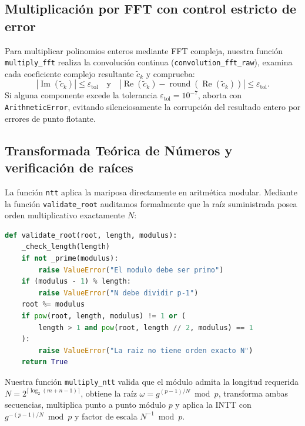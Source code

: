 \subsection{Multiplicación por FFT con control estricto de error}
Para multiplicar polinomios enteros mediante FFT compleja, nuestra función \texttt{multiply\_fft} realiza la convolución continua (\texttt{convolution\_fft\_raw}), examina cada coeficiente complejo resultante $\tilde{c}_k$ y comprueba:
\begin{equation}
|\operatorname{Im}(\tilde{c}_k)| \le \varepsilon_{\text{tol}} \quad \text{y} \quad |\operatorname{Re}(\tilde{c}_k) - \operatorname{round}(\operatorname{Re}(\tilde{c}_k))| \le \varepsilon_{\text{tol}}.
\end{equation}
Si alguna componente excede la tolerancia $\varepsilon_{\text{tol}} = 10^{-7}$, aborta con \texttt{ArithmeticError}, evitando silenciosamente la corrupción del resultado entero por errores de punto flotante.

\subsection{Transformada Teórica de Números y verificación de raíces}
La función \texttt{ntt} aplica la mariposa directamente en aritmética modular. Mediante la función \texttt{validate\_root} auditamos formalmente que la raíz suministrada posea orden multiplicativo exactamente $N$:
\begin{lstlisting}[language=Python,caption={Verificación de raíz de orden exacto N en Fp}]
def validate_root(root, length, modulus):
    _check_length(length)
    if not _prime(modulus):
        raise ValueError("El modulo debe ser primo")
    if (modulus - 1) % length:
        raise ValueError("N debe dividir p-1")
    root %= modulus
    if pow(root, length, modulus) != 1 or (
        length > 1 and pow(root, length // 2, modulus) == 1
    ):
        raise ValueError("La raiz no tiene orden exacto N")
    return True
\end{lstlisting}
Nuestra función \texttt{multiply\_ntt} valida que el módulo admita la longitud requerida $N = 2^{\lceil \log_2(m+n-1) \rceil}$, obtiene la raíz $\omega = g^{(p-1)/N} \bmod p$, transforma ambas secuencias, multiplica punto a punto módulo $p$ y aplica la INTT con $g^{-(p-1)/N} \bmod p$ y factor de escala $N^{-1} \bmod p$.
